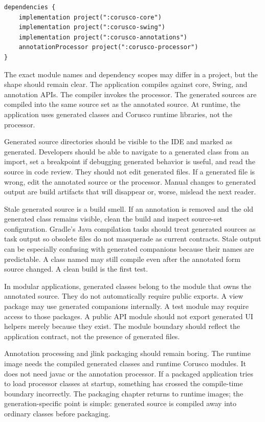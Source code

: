 \begin{lstlisting}[caption={Typical Gradle dependency shape.}]
dependencies {
    implementation project(":corusco-core")
    implementation project(":corusco-swing")
    implementation project(":corusco-annotations")
    annotationProcessor project(":corusco-processor")
}
\end{lstlisting}

The exact module names and dependency scopes may differ in a project, but the
shape should remain clear. The application compiles against core, Swing, and
annotation APIs. The compiler invokes the processor. The generated sources are
compiled into the same source set as the annotated source. At runtime, the
application uses generated classes and Corusco runtime libraries, not the
processor.

Generated source directories should be visible to the IDE and marked as
generated. Developers should be able to navigate to a generated class from an
import, set a breakpoint if debugging generated behavior is useful, and read
the source in code review. They should not edit generated files. If a
generated file is wrong, edit the annotated source or the processor. Manual
changes to generated output are build artifacts that will disappear or, worse,
mislead the next reader.

Stale generated source is a build smell. If an annotation is removed and the
old generated class remains visible, clean the build and inspect source-set
configuration. Gradle's Java compilation tasks should treat generated sources
as task output so obsolete files do not masquerade as current contracts. Stale
output can be especially confusing with generated companions because their
names are predictable. A class named  may still compile
even after the annotated form source changed. A clean build is the first test.

In modular applications, generated classes belong to the module that owns the
annotated source. They do not automatically require public exports. A view
package may use generated companions internally. A test module may require
access to those packages. A public API module should not export generated UI
helpers merely because they exist. The module boundary should reflect the
application contract, not the presence of generated files.

Annotation processing and jlink packaging should remain boring. The runtime
image needs the compiled generated classes and runtime Corusco modules. It
does not need javac or the annotation processor. If a packaged application
tries to load processor classes at startup, something has crossed the
compile-time boundary incorrectly. The packaging chapter returns to runtime
images; the generation-specific point is simple: generated source is compiled
away into ordinary classes before packaging.

